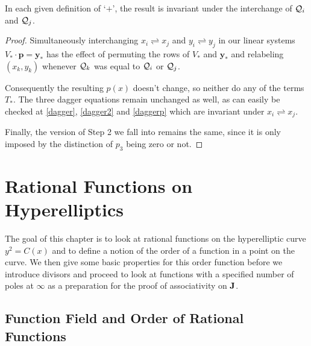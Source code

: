 \documentclass[english,11pt,a4paper]{article}
\begin{document}
\begin{lemma}
In each given definition of `$+$', the result is invariant under the interchange of $\mathcal{Q}_i$ and $\mathcal{Q}_j$.

\begin{proof}
  Simultaneously interchanging $x_i \rightleftharpoons x_j$ and $y_i \rightleftharpoons y_j$ in our linear systems $V_{\ast} \cdot \mathbf{p} = \mathbf{y}_{\ast}$ has the effect of permuting the rows of $V_{\ast}$ and $\mathbf{y}_{\ast}$ and relabeling $(x_k,y_k)$ whenever $\mathcal{Q}_k$ was equal to $\mathcal{Q}_i$ or $\mathcal{Q}_j$.

  Consequently the resulting $p(x)$ doesn't change, so neither do any of the terms $T_{\ast}$. The three dagger equations remain unchanged as well, as can easily be checked at \eqref{dagger}, \eqref{dagger2} and \eqref{daggerp} which are invariant under $x_i \rightleftharpoons x_j$.

  Finally, the version of Step 2 we fall into remains the same, since it is only imposed by the distinction of $p_3$ being zero or not.
\end{proof}
\end{lemma}


\newpage

\section{Rational Functions on Hyperelliptics}

The goal of this chapter is to look at rational functions on the hyperelliptic curve $y^2 = C(x)$ and to define a notion of the order of a function in a point on the curve. We then give some basic properties for this order function before we introduce divisors and proceed to look at functions with a specified number of poles at $\infty$ as a preparation for the proof of associativity on $\mathbf{J}$. %

\subsection{Function Field and Order of Rational Functions}
\end{document}
